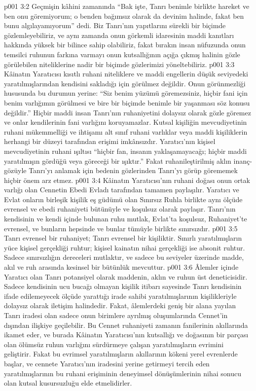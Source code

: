 \vs p001 3:2 Geçmişin kâhini zamanında “Bak işte, Tanrı benimle birlikte hareket ve ben onu göremiyorum; o benden bağımsız olarak da devinim halinde, fakat ben bunu algılayamıyorum” dedi. Biz Tanrı’nın yapıtlarını sürekli bir biçimde gözlemleyebiliriz, ve aynı zamanda onun görkemli idaresinin maddi kanıtları hakkında yüksek bir bilince sahip olabiliriz, fakat bırakın insan nüfuzunda onun temsilci ruhunun farkına varmayı onun kutsallığının açığa çıkmış halinin gözle görülebilen niteliklerine nadir bir biçimde gözlerimizi yöneltebiliriz.
\vs p001 3:3 Kâinatın Yaratıcısı kısıtlı ruhani niteliklere ve maddi engellerin düşük seviyedeki yaratılmışlarından kendisini sakladığı için görülmez değildir. Onun görünmezliği hususunda bu durumun yerine: “Siz benim yüzümü göremezsiniz, hiçbir fani için benim varlığımın görülmesi ve bire bir biçimde benimle bir yaşanması söz konusu değildir.” Hiçbir maddi insan Tanrı’nın ruhaniyetini dolaysız olarak gözle göremez ve onlar kendilerinin fani varlığını koruyamazlar. Kutsal kişiliğin mevcudiyetinin ruhani mükemmelliği ve ihtişamı alt sınıf ruhani varlıklar veya maddi kişiliklerin herhangi bir düzeyi tarafından erişimi imkânsızdır. Yaratıcı’nın kişisel mevcudiyetinin ruhani ışıltısı “hiçbir fan, insanın yaklaşamayacağı; hiçbir maddi yaratılmışın gördüğü veya göreceği bir ışıktır.” Fakat ruhanileştirilmiş aklın inanç\hyp{}gözüyle Tanrı’yı anlamak için bedenin gözlerinden Tanrı’yı görüp görememek hiçbir önem arz etmez.
\vs p001 3:4 Kâinatın Yaratıcısı’nın ruhani doğası onun ortak varlığı olan Cennetin Ebedi Evladı tarafından tamamen paylaşılır. Yaratıcı ve Evlat onların birleşik kişilik eş güdümü olan Sınırsız Ruhla birlikte aynı ölçüde evrensel ve ebedi ruhaniyeti bütünüyle ve koşulsuz olarak paylaşır. Tanrı’nın kendisinin ve kendi içinde bulunan ruhu mutlak, Evlat’ta koşulsuz, Ruhaniyet’te evrensel, ve bunların hepsinde ve bunlar tümüyle birlikte sınırsızdır.
\vs p001 3:5 Tanrı evrensel bir ruhaniyet; Tanrı evrensel bir kişiliktir. Sınırlı yaratılmışların yüce kişisel gerçekliği ruhtur; kişisel kainatın nihai gerçekliği ise absonit ruhtur. Sadece sınırsızlığın dereceleri mutlaktır, ve sadece bu seviyeler üzerinde madde, akıl ve ruh arasında kesinsel bir bütünlük mevcuttur.
\vs p001 3:6 Âlemler içinde Yaratıcı olan Tanrı potansiyel olarak maddenin, aklın ve ruhun üst deneticisidir. Sadece kendisinin ucu bucağı olmayan kişilik itibarı sayesinde Tanrı kendisinin ifade edilemeyecek ölçüde yarattığı irade sahibi yaratılmışlarının kişilikleriyle dolaysız olarak iletişim halindedir. Fakat, âlemlerdeki geniş bir alana yayılan Tanrı iradesi olan sadece onun birimlere ayrılmış oluşumlarında Cennet’in dışından ilişkiye geçilebilir. Bu Cennet ruhaniyeti zamanın fanilerinin akıllarında ikamet eder, ve burada Kâinatın Yaratıcısı’nın kutsallığı ve doğasının bir parçası olan ölümsüz ruhun varlığını sürdürmeye çalışan yaratılmışların evrimini geliştirir. Fakat bu evrimsel yaratılmışların akıllarının kökeni yerel evrenlerde başlar, ve cennete Yaratıcı’nın iradesini yerine getirmeyi tercih eden yaratılmışlarının bu ruhani erişiminin deneyimsel dönüşümlerinin nihai sonucu olan kutsal kusursuzluğu elde etmelidirler.
